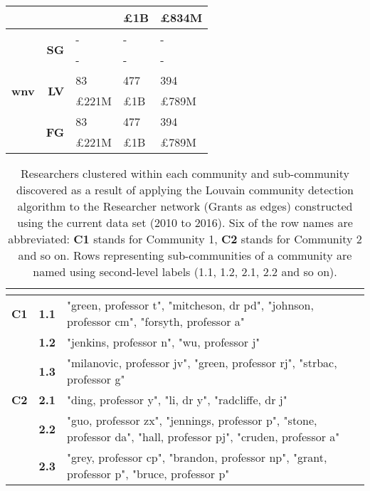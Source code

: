 \begin{table}[!htbp]
\begin{tabular}{r|r|>{\raggedleft\arraybackslash}p{3.5cm}|>{\raggedleft\arraybackslash}p{3.2cm}|>{\raggedleft\arraybackslash}p{3.5cm}}
& {} &{\pounds177M} & {\pounds1B} & {\pounds834M}\\
\hline
\multirow{6}{*}{\textbf{wnv}}
& \multirow{2}{*}{\textbf{SG}}
& {-} & {-} & {-}\\
& {} & {-} & {-} & {-}\\
\cline{2-5}
& \multirow{2}{*}{\textbf{LV}}
& {83} & {477} & {394}\\
& {} & {\pounds221M} & {\pounds1B} & {\pounds789M}\\
\cline{2-5}
& \multirow{2}{*}{\textbf{FG}}
& {83} & {477} & {394}\\
& {} & {\pounds221M} & {\pounds1B} & {\pounds789M}\\
\end{tabular}
\end{table}

\begin{spacing}{0.9}
\begin{longtable}[r]{r|r|p{11.5cm}}
\caption[Researchers clustered within each community and sub-community discovered in the Researcher network (Grants as edges) constructed using the current data set (2010 to 2016)]{Researchers clustered within each community and sub-community discovered as a result of applying the Louvain community detection algorithm to the Researcher network (Grants as edges) constructed using the current data set (2010 to 2016). Six of the row names are abbreviated: \textbf{C1} stands for Community 1, \textbf{C2} stands for Community 2 and so on. Rows representing sub-communities of a community are named using second-level labels (1.1, 1.2, 2.1, 2.2 and so on).}\\
\label{table:researcher_b_current_clusters_appendix}
{} & {}\\
\hline
\endhead
\textbf{C1}
& \textbf{1.1} & {"green, professor t", "mitcheson, dr pd", "johnson, professor cm", "forsyth, professor a"}\\
& \textbf{1.2} & {"jenkins, professor n", "wu, professor j"}\\
& \textbf{1.3} & {"milanovic, professor jv", "green, professor rj", "strbac, professor g"}\\
\hline
\textbf{C2}
& \textbf{2.1} & {"ding, professor y", "li, dr y", "radcliffe, dr j"}\\
& \textbf{2.2} & {"guo, professor zx", "jennings, professor p", "stone, professor da", "hall, professor pj", "cruden, professor a"}\\
& \textbf{2.3} & {"grey, professor cp", "brandon, professor np", "grant, professor p", "bruce, professor p"}
\end{longtable}
\end{spacing}

